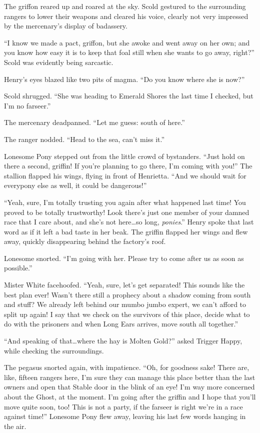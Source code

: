 The griffon reared up and roared at the sky. Scold gestured to the surrounding rangers to lower their weapons and cleared his voice, clearly not very impressed by the mercenary's display of badassery.

``I know we made a pact, griffon, but she awoke and went away on her own; and you know how easy it is to keep that foal still when she wants to go away, right?'' Scold was evidently being sarcastic.

Henry's eyes blazed like two pits of magma. ``Do you know where she is now?''

Scold shrugged. ``She was heading to Emerald Shores the last time I checked, but I'm no farseer.''

The mercenary deadpanned. ``Let me guess: south of here.''

The ranger nodded. ``Head to the sea, can't miss it.''

Lonesome Pony stepped out from the little crowd of bystanders. ``Just hold on there a second, griffin! If you're planning to go there, I'm coming with you!'' The stallion flapped his wings, flying in front of Henrietta. ``And we should wait for everypony else as well, it could be dangerous!''

``Yeah, sure, I'm totally trusting you again after what happened last time! You proved to be totally trustworthy! Look there's just one member of your damned race that I care about, and she's not here\dots so long, \emph{ponies}.'' Henry spoke that last word as if it left a bad taste in her beak. The griffin flapped her wings and flew away, quickly disappearing behind the factory's roof.

Lonesome snorted. ``I'm going with her. Please try to come after us as soon as possible.''

Mister White facehoofed. ``Yeah, sure, let's get separated! This sounds like the best plan ever! Wasn't there still a prophecy about a shadow coming from south and stuff? We already left behind our mumbo jumbo expert, we can't afford to split up again! I say that we check on the survivors of this place, decide what to do with the prisoners and when Long Ears arrives, move south all together.''

``And speaking of that\dots where the hay is Molten Gold?'' asked Trigger Happy, while checking the surroundings.

The pegasus snorted again, with impatience. ``Oh, for goodness sake! There are, like, fifteen rangers here, I'm sure they can manage this place better than the last owners and open that Stable door in the blink of an eye! I'm way more concerned about the Ghost, at the moment. I'm going after the griffin and I hope that you'll move quite soon, too! This is not a party, if the farseer is right we're in a race against time!'' Lonesome Pony flew away, leaving his last few words hanging in the air.

